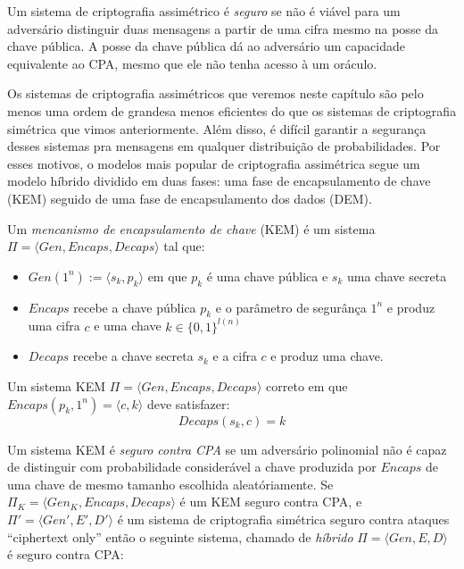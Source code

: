 Um sistema de criptografia assimétrico é {\em seguro} se não é viável para um adversário distinguir duas mensagens a partir de uma cifra mesmo na posse da chave pública.
A posse da chave pública dá ao adversário um capacidade equivalente ao CPA, mesmo que ele não tenha acesso à um oráculo.

Os sistemas de criptografia assimétricos que veremos neste capítulo são pelo menos uma ordem de grandesa menos eficientes do que os sistemas de criptografia simétrica que vimos anteriormente.
Além disso, é difícil garantir a segurança desses sistemas pra mensagens em qualquer distribuição de probabilidades.
Por esses motivos, o modelos mais popular de criptografia assimétrica segue um modelo híbrido dividido em duas fases: uma fase de encapsulamento de chave (KEM) seguido de uma fase de encapsulamento dos dados (DEM).

Um {\em mencanismo de encapsulamento de chave} (KEM) é um sistema $\Pi = \langle Gen, Encaps, Decaps \rangle$ tal que:
\begin{itemize}
\item $Gen(1^n) := \langle s_k, p_k \rangle$ em que $p_k$ é uma chave pública e $s_k$ uma chave secreta
\item $Encaps$ recebe a chave pública $p_k$ e o parâmetro de segurânça $1^n$ e produz uma cifra $c$ e uma chave $k \in \{0,1\}^{l(n)}$
\item $Decaps$ recebe a chave secreta $s_k$ e a cifra $c$ e produz uma chave.
\end{itemize}
 
Um sistema KEM $\Pi = \langle Gen, Encaps, Decaps \rangle$ correto em que $Encaps(p_k, 1^n) = \langle c, k \rangle$ deve satisfazer:
\begin{displaymath}
  Decaps(s_k, c) =  k
\end{displaymath}

Um sistema KEM é {\em seguro contra CPA} se um adversário polinomial não é capaz de distinguir com probabilidade considerável a chave produzida por $Encaps$ de uma chave de mesmo tamanho escolhida aleatóriamente.
Se $\Pi_K = \langle Gen_K, Encaps, Decaps \rangle$ é um KEM seguro contra CPA, e $\Pi' = \langle Gen', E', D' \rangle$ é um sistema de criptografia simétrica seguro contra ataques ``ciphertext only'' então o seguinte sistema, chamado de {\em híbrido} $\Pi = \langle Gen, E, D \rangle$ é seguro contra CPA:

